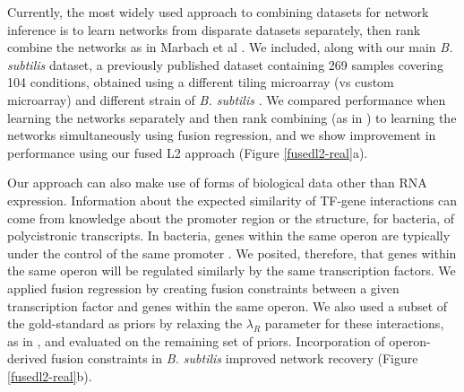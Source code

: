 \documentclass[11pt]{article}
\begin{document}
Currently, the most widely used approach to combining datasets for network inference is to learn networks from disparate datasets separately, then rank combine the networks as in Marbach et al \cite{marbach_revealing_2010}.
We included, along with our main \textit{B. subtilis} dataset, a previously published dataset containing 269 samples covering 104 conditions, obtained using a different tiling microarray (vs custom microarray) and different strain of \textit{B. subtilis} \cite{nicolas2012condition}. 
We compared performance when learning the networks separately and then rank combining (as in \cite{ciofani_validated_2012}) to learning the networks simultaneously using fusion regression, and we show improvement in performance using our fused L2 approach (Figure \ref{fusedl2-real}a). 

Our approach can also make use of forms of biological data other than RNA expression. Information about the expected similarity of TF-gene interactions can come from knowledge about the promoter region or the structure, for bacteria, of polycistronic transcripts. In bacteria, genes within the same operon are typically under the control of the same promoter \cite{lawrence_shared_2002}. We posited, therefore, that genes within the same operon will be regulated similarly by the same transcription factors. We applied fusion regression by creating fusion constraints between a given transcription factor and genes within the same operon. We also used a subset of the gold-standard as priors by relaxing the $\lambda_R$ parameter for these interactions, as in \cite{greenfield_robust_2013}, and evaluated on the remaining set of priors. Incorporation of operon-derived fusion constraints in \textit{B. subtilis} improved network recovery (Figure \ref{fusedl2-real}b). 
\end{document}
